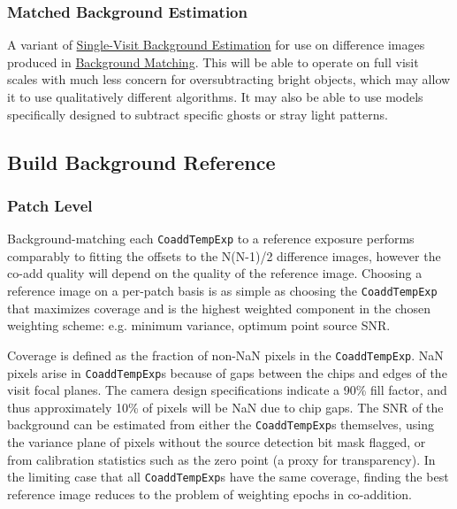 \subsubsection{Matched Background Estimation}
\label{sec:acMatchedBackgroundEstimation}

A variant of \hyperref[sec:acSingleVisitBackgroundEstimation]{Single-Visit Background Estimation} for use on difference images produced in \hyperref[sec:drpBackgroundMatchAndReject]{Background Matching}.  This will be able to operate on full visit scales with much less concern for oversubtracting bright objects, which may allow it to use qualitatively different algorithms.  It may also be able to use models specifically designed to subtract specific ghosts or stray light patterns.

\subsection{Build Background Reference}
\label{sec:acBuildBackgroundReference}

\subsubsection{Patch Level}
Background-matching each \texttt{CoaddTempExp} to a reference exposure performs comparably to fitting
the offsets to the N(N-1)/2 difference images, however the co-add quality will depend on the quality of the
reference image.  Choosing a reference image on a per-patch basis is as simple as choosing the \texttt{CoaddTempExp} that
maximizes coverage and is the highest weighted component in the chosen weighting scheme: e.g. minimum variance, optimum point source SNR. 

Coverage is defined as the fraction of non-NaN
pixels in the \texttt{CoaddTempExp}. NaN pixels arise in \texttt{CoaddTempExp}s because of gaps between the chips and edges of the visit focal
planes.  The camera design specifications indicate a 90\% fill factor, and thus approximately 10\% of pixels
will be NaN due to chip gaps.  The SNR of the background can be estimated from either the \texttt{CoaddTempExp}s themselves,
using the variance plane of pixels without the source detection bit mask flagged, or from calibration
statistics such as the zero point (a proxy for transparency).  In the limiting case that all \texttt{CoaddTempExp}s have the
same coverage, finding the best reference image reduces to the problem of weighting epochs in co-addition.

